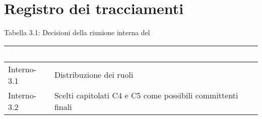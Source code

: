 \section{Registro dei tracciamenti}
{
Tabella 3.1: Decisioni della riunione interna del \Data{}
\renewcommand{\arraystretch}{1.5}
\centering
\begin{longtable}{C{3cm} C{9cm}}
\textcolor{white}{\textbf{Codice}}&
\textcolor{white}{\textbf{Decisione}}\\	
\endhead
		
Interno-3.1 & Distribuzione dei ruoli\\

Interno-3.2 & Scelti capitolati C4 e C5 come possibili committenti finali\\
		
\end{longtable}
}
